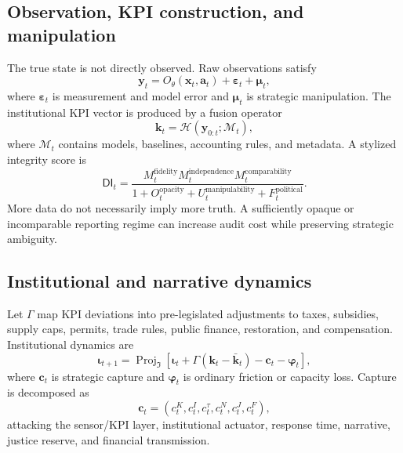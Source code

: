 \documentclass[11pt,a4paper]{article}
\numberwithin{equation}{section}
\theoremstyle{definition}
\theoremstyle{plain}
\theoremstyle{remark}
\newcommand{\Proj}{\operatorname{Proj}}
\newcommand{\state}{\bm{x}}
\newcommand{\kpi}{\bm{k}}
\newcommand{\action}{\bm{a}}
\newcommand{\capture}{\bm{c}}
\newcommand{\inst}{\bm{\iota}}
\begin{document}
\subsection{Observation, KPI construction, and manipulation}

The true state is not directly observed. Raw observations satisfy
\begin{equation}
  \bm{y}_t=O_{\theta}(\state_t,\action_t)+\bm{\varepsilon}_t+\bm{\mu}_t,
  \label{eq:observation}
\end{equation}
where $\bm{\varepsilon}_t$ is measurement and model error and $\bm{\mu}_t$ is strategic manipulation. The institutional KPI vector is produced by a fusion operator
\begin{equation}
  \kpi_t=\mathcal H(\bm{y}_{0:t};\mathcal M_t),
  \label{eq:kpi}
\end{equation}
where $\mathcal M_t$ contains models, baselines, accounting rules, and metadata. A stylized integrity score is
\begin{equation}
\mathsf{DI}_t=
\frac{M_t^{\mathrm{fidelity}}M_t^{\mathrm{independence}}M_t^{\mathrm{comparability}}}
{1+O_t^{\mathrm{opacity}}+U_t^{\mathrm{manipulability}}+F_t^{\mathrm{political}}}.
\label{eq:dataintegrity}
\end{equation}
More data do not necessarily imply more truth. A sufficiently opaque or incomparable reporting regime can increase audit cost while preserving strategic ambiguity.

\subsection{Institutional and narrative dynamics}

Let $\Gamma$ map KPI deviations into pre-legislated adjustments to taxes, subsidies, supply caps, permits, trade rules, public finance, restoration, and compensation. Institutional dynamics are
\begin{equation}
\inst_{t+1}=\Proj_{\mathfrak I}\left[
\inst_t+\Gamma(\kpi_t-\bar{\kpi}_t)-\capture_t-\bm{\varphi}_t
\right],
\label{eq:institution}
\end{equation}
where $\capture_t$ is strategic capture and $\bm{\varphi}_t$ is ordinary friction or capacity loss. Capture is decomposed as
\begin{equation}
\capture_t=(c_t^{K},c_t^{I},c_t^{\tau},c_t^{N},c_t^{J},c_t^{F}),
\label{eq:capture}
\end{equation}
attacking the sensor/KPI layer, institutional actuator, response time, narrative, justice reserve, and financial transmission.
\end{document}
